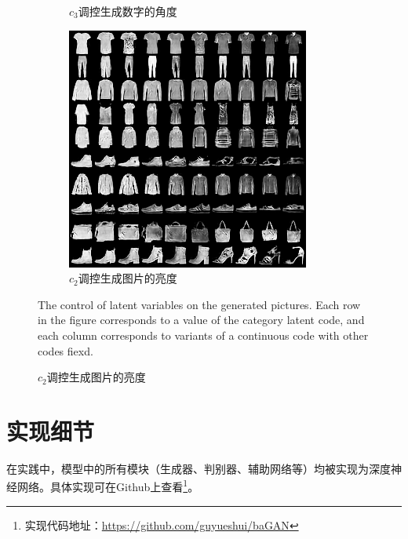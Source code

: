 \begin{figure}[htb]
\begin{subfigure}[b]{\trif\textwidth}
    \caption{$c_3$调控生成数字的角度}
    \label{ffig:m-icg-rotation}
  \end{subfigure} 
  \begin{subfigure}[b]{\trif\textwidth}
    \includegraphics[width=\textwidth]{Img/icg-light.png}
    \caption{$c_2$调控生成图片的亮度}
    \label{ffig:fa-icg-light}
  \end{subfigure} 
  {The control of latent variables on the generated pictures. Each row in the figure corresponds to a value of the category latent code, and each column corresponds to variants of a continuous code with other codes fiexd.}
  \label{fig:latent-varies}
\end{figure}

\section{实现细节}
在实践中，模型中的所有模块（生成器、判别器、辅助网络等）均被实现为深度神经网络。具体实现可在Github上查看\footnote{实现代码地址：\url{https://github.com/guyueshui/baGAN}}。

